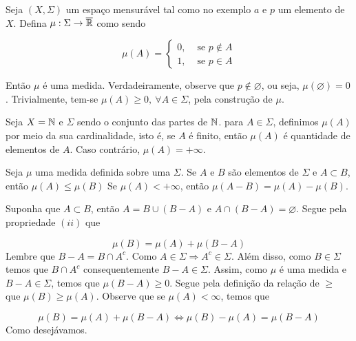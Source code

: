 \begin{example}
\label{ex:medida-concentrada-em-p}
    Seja $(X, \Sigma)$ um espaço mensurável tal como no exemplo $a$ e $p$ um elemento de $X$.
    Defina $\mu: \Sigma \to \operatorname{\overline{\mathbb{R}}}$  como sendo


$$\mu(A) = \left\{\begin{array}{cc}
0, & \textrm{\ se \ } p \notin A \\
1, & \textrm{\ se \ } p \in A 
\end{array}\right.$$


Então $\mu$ é uma medida.
Verdadeiramente, observe que $p \notin \varnothing$, ou seja, $\mu(\varnothing) = 0$.
Trivialmente, tem-se $\mu(A) \geq 0,\ \forall A \in \Sigma$, pela construção de $\mu$.



\end{example}

\begin{example}
    Seja $X = \operatorname{\mathbb{N}}$ e $\Sigma$ sendo o conjunto das partes de $\operatorname{\mathbb{N}}$. 
para $A \in \Sigma$, definimos $\mu(A)$ por meio da sua cardinalidade, isto é, se $A$ é finito, então $\mu(A)$ é quantidade de elementos de $A$. Caso contrário, $\mu(A) = +\infty$.

\end{example}





\begin{theorem}
\label{teo:operacoes-com-medidas-1}
	Seja $\mu$ uma medida definida sobre uma \sigal $\Sigma$.
	Se $A$ e $B$ são elementos de $\Sigma$ e $A \subset B$, então $\mu(A) \leq \mu(B)$
	Se $\mu(A) < +\infty$, então $\mu(A-B) = \mu(A) - \mu(B)$.
\end{theorem}

\begin{prova}
	Suponha que $A \subset B$, então $A = B \cup (B - A)$ e $A \cap (B - A) = \varnothing$. Segue pela propriedade $(ii)$ que 
	
	$$\mu(B) = \mu(A) + \mu(B-A)$$
 Lembre que $B-A = B\cap A^c$. Como $A \in \Sigma \Rightarrow A^c \in \Sigma$.
 Além disso, como $B \in \Sigma$ temos que $ B\cap A^c$ consequentemente $B - A \in \Sigma$.
 Assim, como $\mu$ é uma medida e $B-A \in \Sigma$, temos que $\mu(B-A) \geq 0$.
 Segue pela definição da relação de $\geq$ que $\mu(B) \geq \mu(A)$.
 Observe que se $\mu(A) < \infty$, temos que 

	$$\mu(B) = \mu(A) + \mu(B-A) 
 \Leftrightarrow \mu(B) - \mu(A) =  \mu(B-A)
 $$
Como desejávamos.
\end{prova}

